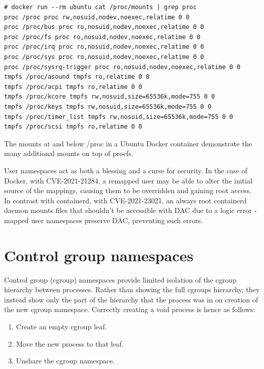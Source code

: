 \documentclass[12pt,a4paper,twoside]{report}
\begin{document}
\begin{listing}
\begin{verbatim}
# docker run --rm ubuntu cat /proc/mounts | grep proc
proc /proc proc rw,nosuid,nodev,noexec,relatime 0 0
proc /proc/bus proc ro,nosuid,nodev,noexec,relatime 0 0
proc /proc/fs proc ro,nosuid,nodev,noexec,relatime 0 0
proc /proc/irq proc ro,nosuid,nodev,noexec,relatime 0 0
proc /proc/sys proc ro,nosuid,nodev,noexec,relatime 0 0
proc /proc/sysrq-trigger proc ro,nosuid,nodev,noexec,relatime 0 0
tmpfs /proc/asound tmpfs ro,relatime 0 0
tmpfs /proc/acpi tmpfs ro,relatime 0 0
tmpfs /proc/kcore tmpfs rw,nosuid,size=65536k,mode=755 0 0
tmpfs /proc/keys tmpfs rw,nosuid,size=65536k,mode=755 0 0
tmpfs /proc/timer_list tmpfs rw,nosuid,size=65536k,mode=755 0 0
tmpfs /proc/scsi tmpfs ro,relatime 0 0
\end{verbatim}

\caption{The mounts at and below /proc in a Ubuntu Docker container demonstrate the many additional mounts on top of procfs.}
\label{lst:docker-procfs}
\end{listing}

User namespaces act as both a blessing and a curse for security. In the case of Docker, with CVE-2021-21284, a remapped user may be able to alter the initial source of the mappings, causing them to be overridden and gaining root access. In contrast with containerd, with CVE-2021-23021, an always root containerd daemon mounts files that shouldn't be accessible with DAC due to a logic error - mapped user namespaces preserve DAC, preventing such errors.

\section{Control group namespaces}
\label{sec:voiding-cgroup}

Control group (cgroup) namespaces provide limited isolation of the cgroup hierarchy between processes. Rather than showing the full cgroups hierarchy, they instead show only the part of the hierarchy that the process was in on creation of the new cgroup namespace. Correctly creating a void process is hence as follows:

\begin{enumerate}
    \item Create an empty cgroup leaf.
    \item Move the new process to that leaf.
    \item Unshare the cgroup namespace.
\end{enumerate}
\end{document}
